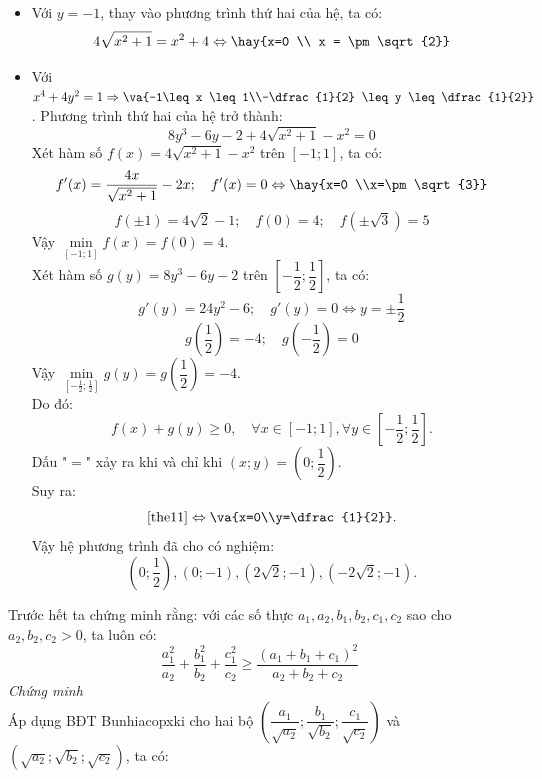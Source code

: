 \begin{itemize}
\item Với $y=-1$, thay vào phương trình thứ hai của hệ, ta có:
$$4\sqrt{x^2+1}=x^2+4 \Leftrightarrow \hay{x=0 \\ x = \pm \sqrt{2}}$$
\item Với $x^4+4y^2=1 \Rightarrow \va{-1\leq x \leq 1\\-\dfrac{1}{2} \leq y \leq \dfrac{1}{2}}$. Phương trình thứ hai của hệ trở thành:
\begin{equation} \label{the11}
8y^3-6y-2+4\sqrt{x^2+1}-x^2=0
\end{equation}
Xét hàm số $f(x)=4\sqrt{x^2+1}-x^2$ trên $[-1;1]$, ta có:
$$f'(x) = \dfrac{4x}{\sqrt{x^2+1}}-2x; \quad f'(x) = 0 \Leftrightarrow \hay{x=0 \\x=\pm \sqrt{3}}$$
$$f(\pm 1) = 4\sqrt{2}-1; \quad f(0) = 4; \quad f(\pm \sqrt{3}) = 5$$
Vậy $\min\limits_{[-1;1]} f(x)=f(0)=4$.\\
Xét hàm số $g(y)=8y^3-6y-2$ trên $\left[-\dfrac{1}{2};\dfrac{1}{2}\right]$, ta có:
$$g'(y) = 24y^2-6; \quad g'(y) = 0 \Leftrightarrow y = \pm \dfrac{1}{2}$$
$$g\left(\dfrac{1}{2}\right) =-4; \quad g\left(-\dfrac{1}{2}\right)=0$$
Vậy $\min\limits_{\left[-\frac{1}{2};\frac{1}{2}\right]}g(y)=g\left(\dfrac{1}{2}\right) =-4$.\\
Do đó:
$$f(x)+g(y) \geq 0, \quad \forall x \in [-1;1], \forall y \in \left[-\dfrac{1}{2};\dfrac{1}{2}\right].$$
Dấu "$=$" xảy ra khi và chỉ khi $(x;y)=\left(0;\dfrac{1}{2}\right)$.\\
Suy ra:
$$\eqref{the11} \Leftrightarrow \va{x=0\\y=\dfrac{1}{2}}.$$
Vậy hệ phương trình đã cho có nghiệm:
$$\left(0;\dfrac{1}{2}\right), (0;-1), (2\sqrt{2};-1), (-2\sqrt{2};-1).$$
\end{itemize}
\lgi
Trước hết ta chứng minh rằng: với các số thực $a_1,a_2,b_1,b_2,c_1,c_2$ sao cho $a_2,b_2,c_2>0$, ta luôn có:
\begin{equation}\label{the12}
\dfrac{a_1^2}{a_2}+\dfrac{b_1^2}{b_2}+\dfrac{c_1^2}{c_2} \geq \dfrac{(a_1+b_1+c_1)^2}{a_2+b_2+c_2}
\end{equation}
\textit{Chứng minh}\\
Áp dụng BĐT Bunhiacopxki cho hai bộ $\left(\dfrac{a_1}{\sqrt{a_2}};\dfrac{b_1}{\sqrt{b_2}}; \dfrac{c_1}{\sqrt{c_2}}\right)$ và $\left(\sqrt{a_2}; \sqrt{b_2}; \sqrt{c_2}\right)$, ta có:
